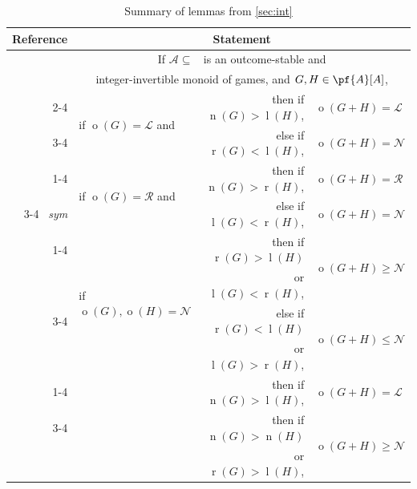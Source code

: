 \documentclass[11pt]{article}
\theoremstyle{definition}
\DeclareMathOperator{\outcome}{o}
\newcommand{\set}[1]{\mathcal{#1}}
\DeclareMathOperator{\maug}{\set{M}_\text{aug}}
\DeclareMathOperator{\ltp}{l}
\DeclareMathOperator{\ntp}{n}
\DeclareMathOperator{\rtp}{r}
\begin{document}
\renewcommand{\arraystretch}{1.2}
\begin{table}
\caption{Summary of lemmas from \cref{sec:int}}
\vspace{3pt}
\centering
\begin{tabular}{r|lrl}
    \hline
    \rowcolor{gray!50} Reference & \multicolumn{3}{c}{Statement} \\[2pt]
    \hline
                                 & \multicolumn{3}{c}{If
                                     $\set{A}\subseteq\maug$ is an
                                 outcome-stable and}\\
                                 & \multicolumn{3}{c}{integer-invertible monoid
                                     of games, and
                                 $G,H\in\pf{A}[A]$,}\\
    \cmidrule(lr){2-4}
    \multirow{2}{*}{\cref{lem:11}} & \multirow{2}{*}{if
    $\outcome(G)=\mathscr{L}$ and}
    & then if $\ntp(G)>\ltp(H)$, & $\outcome(G+H)=\mathscr{L}$ \\
    \cmidrule(lr){3-4}
    & $~~\outcome(H)=\mathscr{N}$, & else if 
    $\rtp(G)<\ltp(H)$, &
    $\outcome(G+H)=\mathscr{N}$ \\
    \cmidrule(lr){1-4}
    \multirow{2.5}{*}{\cref{lem:11}}& \multirow{2}{*}{if
    $\outcome(G)=\mathscr{R}$ and}
    & then if $\ntp(G)>\rtp(H)$, & $\outcome(G+H)=\mathscr{R}$ \\
    \cmidrule(lr){3-4}
    {\footnotesize \it ~sym} & $~~\outcome(H)=\mathscr{N}$, & 
    else if 
    $\ltp(G)<\rtp(H)$, &
    $\outcome(G+H)=\mathscr{N}$ \\
    \cmidrule(lr){1-4}
    \multirow{4}{*}{\cref{lem:13}} & \multirow{4}{*}{if
    $\outcome(G),\outcome(H)=\mathscr{N}$}
    & then if $\rtp(G)>\ltp(H)$ &
    \multirow{2}{*}{$\outcome(G+H)\geq\mathscr{N}$} \\
    & & or $\ltp(G)<\rtp(H)$, & \\
    \cmidrule(lr){3-4}
    & & else if $\rtp(G)<\ltp(H)$ &
    \multirow{2}{*}{$\outcome(G+H)\leq\mathscr{N}$} \\
    & & or $\ltp(G)>\rtp(H)$, & \\
    \cmidrule(lr){1-4}
    \multirow{8}{*}{\cref{lem:14}} & & then if $\ntp(G)>\ltp(H)$, &
    $\outcome(G+H)=\mathscr{L}$ \\
    \cmidrule(lr){3-4}
    & & then if $\ntp(G)>\ntp(H)$ &
    \multirow{2}{*}{$\outcome(G+H)\geq\mathscr{N}$}\\
    &  & or $\rtp(G)>\ltp(H)$, &\\

\end{tabular}
\end{table}
\end{document}
